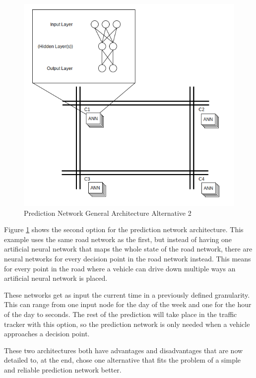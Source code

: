 \begin{figure}[!ht]
  \centering
  \includegraphics[width=16cm]{figures/predictionNetworkAlt2}
  \caption[Prediction Network General Architecture Alternative 2]{Prediction Network General Architecture Alternative 2 \protect\footnotemark}
  \label{predictionNetworkAlt2}
\end{figure}


Figure \ref{predictionNetworkAlt2} shows the second option for the prediction network architecture. This example uses the same road network as the first, but instead of having one artificial neural network that maps the whole state of the road network, there are neural networks for every decision point in the road network instead. This means for every point in the road where a vehicle can drive down multiple ways an artificial neural network is placed.

These networks get as input the current time in a previously defined granularity. This can range from one input node for the day of the week and one for the hour of the day to seconds. The rest of the prediction will take place in the traffic tracker with this option, so the prediction network is only needed when a vehicle approaches a decision point.

These two architectures both have advantages and disadvantages that are now detailed to, at the end, chose one alternative that fits the problem of a simple and reliable prediction network better.

